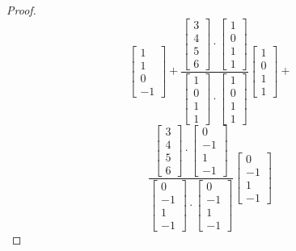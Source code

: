 \documentclass[12pt]{article}
\begin{document}
\begin{proof}
\[\begin{bmatrix}
      1\\1\\0\\-1
    \end{bmatrix}
    +
    \frac{  \begin{bmatrix}
        3\\4\\5\\6
      \end{bmatrix}\cdot \begin{bmatrix}
        1\\0\\1\\1
    \end{bmatrix}}{\begin{bmatrix}
      1\\0\\1\\1
    \end{bmatrix} \cdot \begin{bmatrix}
      1\\0\\1\\1
    \end{bmatrix}}\begin{bmatrix}
      1\\0\\1\\1
    \end{bmatrix}+
  \]
  \[
    \frac{  \begin{bmatrix}
        3\\4\\5\\6
      \end{bmatrix}\cdot \begin{bmatrix}
        0\\-1\\1\\-1
    \end{bmatrix}}{\begin{bmatrix}
        0\\-1\\1\\-1
    \end{bmatrix} \cdot \begin{bmatrix}
        0\\-1\\1\\-1
    \end{bmatrix}}\begin{bmatrix}
        0\\-1\\1\\-1

\end{bmatrix}\]
\end{proof}
\end{document}
